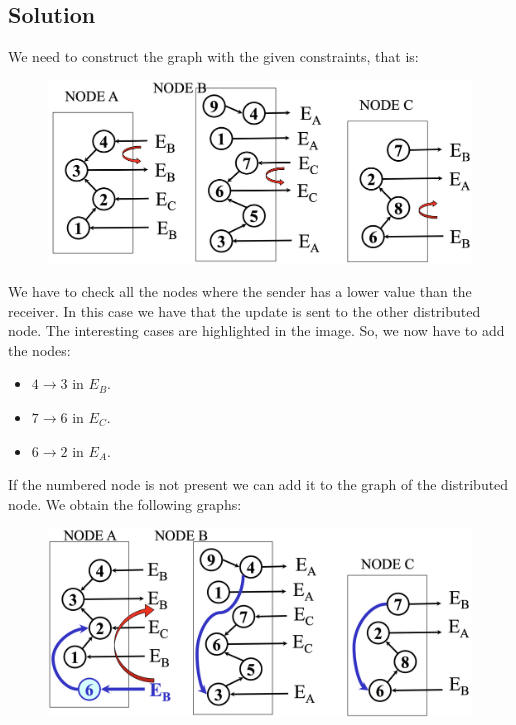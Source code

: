\documentclass[12pt, a4paper]{report}
\newtheorem[style=M,bodystyle=\normalfont]{theorem}{Theorem}
\newtheorem[style=M,bodystyle=\normalfont]{corollary}{Corollary}
\newtheorem[style=M,bodystyle=\normalfont]{lemma}{Lemma}
\newtheorem[style=M,bodystyle=\normalfont]{definition}{Definition}
\begin{document}
    \subsection*{Solution}
        We need to construct the graph with the given constraints, that is: 
        \begin{figure}[H]
            \centering
            \includegraphics[width=1\linewidth]{images/Ob1.png}
        \end{figure}
        We have to check all the nodes where the sender has a lower value than the receiver. In this case we have that the update is sent to the 
        other distributed node. The interesting cases are highlighted in the image. So, we now have to add the nodes: 
        \begin{itemize}
            \item $4 \rightarrow 3$ in $E_B$. 
            \item $7 \rightarrow 6$ in $E_C$. 
            \item $6 \rightarrow 2$ in $E_A$. 
        \end{itemize}
        If the numbered node is not present we can add it to the graph of the distributed node. We obtain the following graphs: 
        \begin{figure}[H]
            \centering
            \includegraphics[width=1\linewidth]{images/Ob2.png}
        \end{figure}
\end{document}
